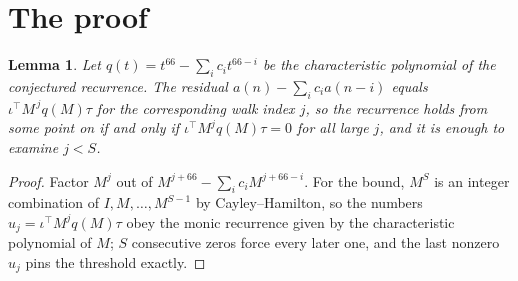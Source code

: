 \documentclass[11pt,a4paper]{article}
\theoremstyle{plain}
\newtheorem{lemma}[theorem]{Lemma}
\theoremstyle{definition}
\begin{document}
\section{The proof}

\begin{lemma}\label{lem:crit}
Let $q(t)=t^{66}-\sum_i c_it^{66-i}$ be the characteristic polynomial of the
conjectured recurrence. The residual $a(n)-\sum_ic_ia(n-i)$ equals
$\iota^{\!\top}M^{\,j}q(M)\tau$ for the corresponding walk index $j$, so the recurrence
holds from some point on if and only if $\iota^{\!\top}M^{j}q(M)\tau=0$ for all large $j$,
and it is enough to examine $j<S$.
\end{lemma}

\begin{proof}
Factor $M^{j}$ out of $M^{j+66}-\sum_ic_iM^{j+66-i}$. For the bound, $M^{S}$
is an integer combination of $I,M,\dots,M^{S-1}$ by Cayley--Hamilton, so the numbers
$u_j=\iota^{\!\top}M^{j}q(M)\tau$ obey the monic recurrence given by the characteristic
polynomial of $M$; $S$ consecutive zeros force every later one, and the last nonzero $u_j$
pins the threshold exactly.
\end{proof}
\end{document}
